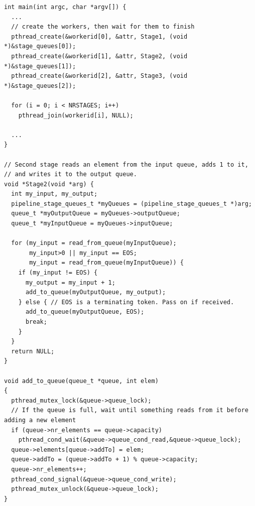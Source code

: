 \begin{lstlisting}[caption=Original Simple Pipeline Code,label=lst:simplePipe]
int main(int argc, char *argv[]) {
  ...  
  // create the workers, then wait for them to finish
  pthread_create(&workerid[0], &attr, Stage1, (void *)&stage_queues[0]);
  pthread_create(&workerid[1], &attr, Stage2, (void *)&stage_queues[1]);
  pthread_create(&workerid[2], &attr, Stage3, (void *)&stage_queues[2]);
  
  for (i = 0; i < NRSTAGES; i++)
    pthread_join(workerid[i], NULL);
  
  ...
}

// Second stage reads an element from the input queue, adds 1 to it,
// and writes it to the output queue.
void *Stage2(void *arg) {
  int my_input, my_output;
  pipeline_stage_queues_t *myQueues = (pipeline_stage_queues_t *)arg;
  queue_t *myOutputQueue = myQueues->outputQueue;
  queue_t *myInputQueue = myQueues->inputQueue;

  for (my_input = read_from_queue(myInputQueue);
       my_input>0 || my_input == EOS;
       my_input = read_from_queue(myInputQueue)) {
    if (my_input != EOS) {
      my_output = my_input + 1;
      add_to_queue(myOutputQueue, my_output);
    } else { // EOS is a terminating token. Pass on if received.
      add_to_queue(myOutputQueue, EOS);
      break;
    }
  }
  return NULL;
}

void add_to_queue(queue_t *queue, int elem)
{
  pthread_mutex_lock(&queue->queue_lock);
  // If the queue is full, wait until something reads from it before adding a new element
  if (queue->nr_elements == queue->capacity)
    pthread_cond_wait(&queue->queue_cond_read,&queue->queue_lock);
  queue->elements[queue->addTo] = elem;
  queue->addTo = (queue->addTo + 1) % queue->capacity;
  queue->nr_elements++;
  pthread_cond_signal(&queue->queue_cond_write);
  pthread_mutex_unlock(&queue->queue_lock);
}
\end{lstlisting}

